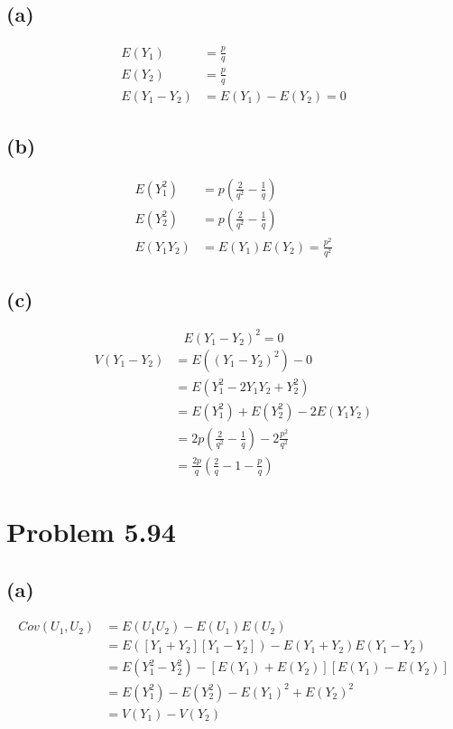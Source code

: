 \documentclass{article}
\theoremstyle{definition}
\begin{document}
    \subsection*{(a)}
        \begin{align*}
            E(Y_1) &= \frac{p}{q}\\
            E(Y_2) &= \frac{p}{q}\\
            E(Y_1 - Y_2) &= E(Y_1) - E(Y_2) = 0
        \end{align*}
    \subsection*{(b)}
        \begin{align*}
            E(Y_1^2) &= p\left(\frac{2}{q^2} - \frac{1}{q}\right)\\
            E(Y_2^2) &= p\left(\frac{2}{q^2} - \frac{1}{q}\right)\\
            E(Y_1 Y_2) &=E(Y_1)E(Y_2) = \frac{p^2}{q^2}
        \end{align*}
    \subsection*{(c)}
        \[
            E(Y_1-Y_2)^2 = 0
        \]
        \begin{align*}
            V(Y_1 - Y_2) &= E((Y_1-Y_2)^2) - 0 \\
            &= E(Y_1^2 - 2Y_1Y_2 + Y_2^2)\\
            & = E(Y_1^2) + E(Y_2^2) - 2E(Y_1Y_2)\\
            &= 2p\left(\frac{2}{q^2} - \frac{1}{q}\right) - 2\frac{p^2}{q^2}\\
            &= \frac{2p}{q}\left(\frac{2}{q} - 1 - \frac{p}{q}\right)
        \end{align*}
\section*{Problem 5.94}
    \subsection*{(a)}
        \begin{align*}
            Cov(U_1, U_2) & = E(U_1 U_2) - E(U_1)E(U_2) \\
            &= E([Y_1 + Y_2][Y_1 - Y_2]) - E(Y_1 + Y_2)E(Y_1 - Y_2) \\
            &= E(Y_1^2 - Y_2^2) - [E(Y_1) + E(Y_2)][E(Y_1) - E(Y_2)]\\
            &=E(Y_1^2) - E(Y_2^2) - E(Y_1)^2 + E(Y_2)^2\\
            &= V(Y_1) - V(Y_2)
        \end{align*}
\end{document}
